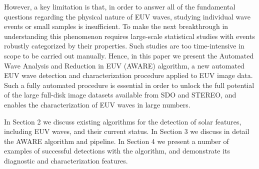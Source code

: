 However, a key limitation is that, in order to answer all of the fundamental questions regarding the
physical nature of EUV waves, studying individual wave events or small
samples is insufficient. To make the next breakthrough in
understanding this phenomenon requires large-scale statistical studies
with events robustly categorized by their properties. Such studies are too time-intensive in scope to be carried out manually. Hence, in this paper we present the Automated Wave Analysis and Reduction in EUV (AWARE) algorithm, a new automated EUV wave
detection and characterization procedure applied to EUV image
data. Such a fully automated procedure is essential in order to unlock
the full potential of the large full-disk image datasets available from SDO and STEREO, and
enables the characterization of EUV waves in large numbers.

In Section 2 we discuss existing algorithms for the detection of solar features, including EUV waves, and their current status. In Section 3 we discuss in detail the AWARE algorithm and pipeline. In Section 4 we present a number of examples of successful detections with the algorithm, and demonstrate its diagnostic and characterization features. 





